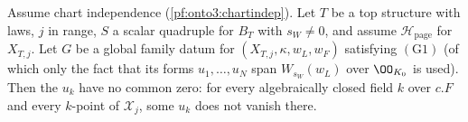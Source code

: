 \begin{proposition}\label{pf:onto3:ncz}
Assume chart independence (\cref{pf:onto3:chartindep}). Let $T$ be a top structure with laws, $j$ in range, $S$ a scalar
quadruple for $B_T$ with $s_W\ne0$, and assume $\mathcal H_{\mathrm{page}}$ for $X_{T,j}$. Let $G$ be a global family datum
for $(X_{T,j},\kappa,w_L,w_F)$ satisfying $(\mathrm G1)$ (of which only the fact that its forms $u_1,\dots,u_N$ span
$W_{s_W}(w_L)$ over $\OO_{K_0}$ is used). Then
the $u_k$ have no common zero: for every algebraically closed field $k$ over $c.F$ and every $k$-point of $\mathcal X_j$,
some $u_k$ does not vanish there.
\end{proposition}

